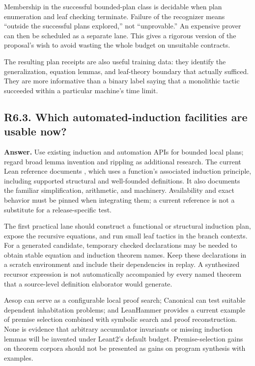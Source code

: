 \documentclass[11pt,a4paper]{article}
\newcommand{\code}[1]{\texttt{\detokenize{#1}}}
\newcommand{\question}[2]{\subsection{#1. #2}\label{q:#1}}
\theoremstyle{definition}
\theoremstyle{remark}
\begin{document}
Membership in the successful bounded-plan class is decidable when plan enumeration and leaf checking terminate. Failure of the recognizer means ``outside the successful plans explored,'' not ``unprovable.'' An expensive prover can then be scheduled as a separate lane. This gives a rigorous version of the proposal's wish to avoid wasting the whole budget on unsuitable contracts.

The resulting plan receipts are also useful training data: they identify the generalization, equation lemmas, and leaf-theory boundary that actually sufficed. They are more informative than a binary label saying that a monolithic tactic succeeded within a particular machine's time limit.

\question{R6.3}{Which automated-induction facilities are usable now?}

\textbf{Answer.} Use existing induction and automation APIs for bounded local plans; regard broad lemma invention and rippling as additional research. The current Lean reference documents \code{fun_induction}, which uses a function's associated induction principle, including supported structural and well-founded definitions. It also documents the familiar simplification, arithmetic, and \code{grind} machinery.\cite{lean-tactics} Availability and exact behavior must be pinned when integrating them; a current reference is not a substitute for a release-specific test.

The first practical lane should construct a functional or structural induction plan, expose the recursive equations, and run small leaf tactics in the branch contexts. For a generated candidate, temporary checked declarations may be needed to obtain stable equation and induction theorem names. Keep these declarations in a scratch environment and include their dependencies in replay. A synthesized recursor expression is not automatically accompanied by every named theorem that a source-level definition elaborator would generate.

Aesop can serve as a configurable local proof search; Canonical can test suitable dependent inhabitation problems; and LeanHammer provides a current example of premise selection combined with symbolic search and proof reconstruction.\cite{aesop,canonical,leanhammer} None is evidence that arbitrary accumulator invariants or missing induction lemmas will be invented under Leant2's default budget. Premise-selection gains on theorem corpora should not be presented as gains on program synthesis with examples.
\end{document}
